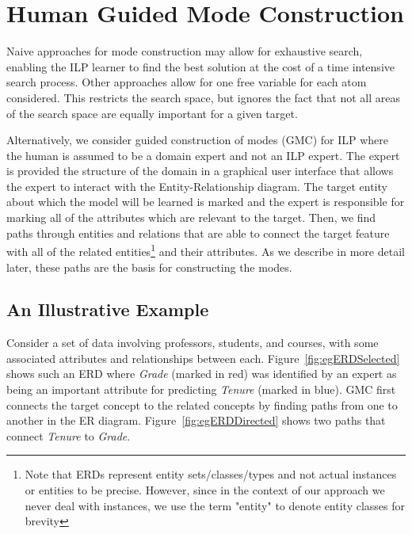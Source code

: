 \documentclass[sigconf]{acmart}
\begin{document}
\section{Human Guided Mode Construction}

Naive approaches for mode construction may allow for exhaustive search, enabling the ILP learner to find the best solution at the cost of a time intensive search process. Other approaches allow for one free variable for each atom considered. This restricts the search space, but ignores the fact that not all areas of the search space are equally important for a given target. 

Alternatively, we consider guided construction of modes (\textsc{GMC}) for ILP where the human is assumed to be a domain expert and not an ILP expert. The expert is provided the structure of the domain in a graphical user interface that allows the expert to interact with the Entity-Relationship diagram. The target entity about which the model will be learned is marked and the expert is responsible for marking all of the attributes which are relevant to the target. Then, we find paths through entities and relations that are able to connect the target feature with all of the related entities\footnote{Note that ERDs represent entity sets/classes/types and not actual instances or entities to be precise. However, since in the context of our approach we never deal with instances, we use the term "entity" to denote entity classes for brevity} and their attributes. As we describe in more detail later, these paths are the basis for constructing the modes.

\subsection{An Illustrative Example}

Consider a set of data involving professors, students, and courses, with some associated attributes and relationships between each. Figure~\ref{fig:egERDSelected} shows such an ERD where \textit{Grade} (marked in red) was identified by an expert as being an important attribute for predicting \textit{Tenure} (marked in blue).
\textsc{GMC} first connects the target concept to the related concepts by finding paths from one to another in the ER diagram. Figure~\ref{fig:egERDDirected} shows two paths that connect \textit{Tenure} to \textit{Grade}. 
\end{document}
